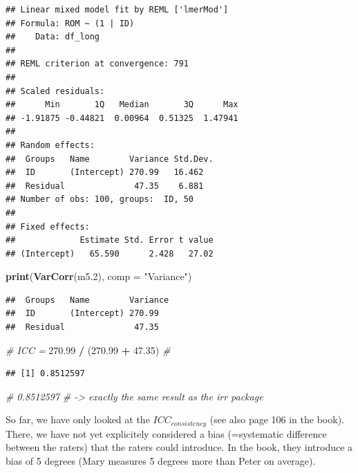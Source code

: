 \documentclass[
]{book}
\newenvironment{Shaded}{\begin{snugshade}}{\end{snugshade}}
\newcommand{\AttributeTok}[1]{\textcolor[rgb]{0.13,0.29,0.53}{#1}}
\newcommand{\CommentTok}[1]{\textcolor[rgb]{0.56,0.35,0.01}{\textit{#1}}}
\newcommand{\FloatTok}[1]{\textcolor[rgb]{0.00,0.00,0.81}{#1}}
\newcommand{\FunctionTok}[1]{\textcolor[rgb]{0.13,0.29,0.53}{\textbf{#1}}}
\newcommand{\NormalTok}[1]{#1}
\newcommand{\SpecialCharTok}[1]{\textcolor[rgb]{0.81,0.36,0.00}{\textbf{#1}}}
\newcommand{\StringTok}[1]{\textcolor[rgb]{0.31,0.60,0.02}{#1}}
\begin{document}
\begin{verbatim}
## Linear mixed model fit by REML ['lmerMod']
## Formula: ROM ~ (1 | ID)
##    Data: df_long
## 
## REML criterion at convergence: 791
## 
## Scaled residuals: 
##      Min       1Q   Median       3Q      Max 
## -1.91875 -0.44821  0.00964  0.51325  1.47941 
## 
## Random effects:
##  Groups   Name        Variance Std.Dev.
##  ID       (Intercept) 270.99   16.462  
##  Residual              47.35    6.881  
## Number of obs: 100, groups:  ID, 50
## 
## Fixed effects:
##             Estimate Std. Error t value
## (Intercept)   65.590      2.428   27.02
\end{verbatim}

\begin{Shaded}
\begin{Highlighting}[]
\FunctionTok{print}\NormalTok{(}\FunctionTok{VarCorr}\NormalTok{(m5}\FloatTok{.2}\NormalTok{), }\AttributeTok{comp =} \StringTok{"Variance"}\NormalTok{)}
\end{Highlighting}
\end{Shaded}

\begin{verbatim}
##  Groups   Name        Variance
##  ID       (Intercept) 270.99  
##  Residual              47.35
\end{verbatim}

\begin{Shaded}
\begin{Highlighting}[]
\CommentTok{\# ICC = }
\FloatTok{270.99} \SpecialCharTok{/}\NormalTok{ (}\FloatTok{270.99} \SpecialCharTok{+} \FloatTok{47.35}\NormalTok{) }\CommentTok{\# }
\end{Highlighting}
\end{Shaded}

\begin{verbatim}
## [1] 0.8512597
\end{verbatim}

\begin{Shaded}
\begin{Highlighting}[]
\CommentTok{\# 0.8512597}
\CommentTok{\# {-}\textgreater{} exactly the same result as the irr package}
\end{Highlighting}
\end{Shaded}

So far, we have only looked at the \textbf{\(ICC_{consistency}\)} (see also page 106 in the book).
There, we have not yet explicitely considered a bias (=systematic difference
between the raters) that the raters could introduce. In the book,
they introduce a bias of 5 degrees (Mary measures 5 degrees more than Peter on average).
\end{document}
